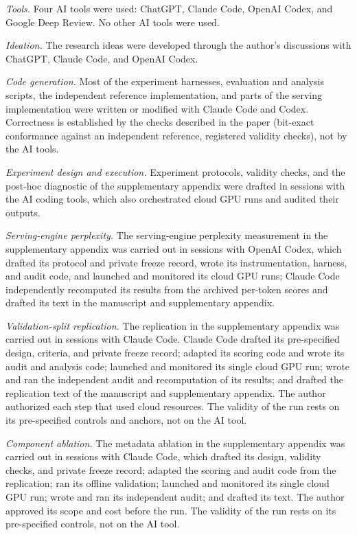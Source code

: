 \documentclass{article}
\begin{document}
\emph{Tools.} Four AI tools were used: ChatGPT, Claude Code, OpenAI Codex, and Google Deep Review. No
other AI tools were used.

\emph{Ideation.} The research ideas were developed through the author's discussions with ChatGPT, Claude Code,
and \mbox{OpenAI} Codex.

\emph{Code generation.} Most of the experiment harnesses, evaluation and analysis scripts, the
independent reference implementation, and parts of the serving implementation were written or modified
with Claude Code and Codex. Correctness is established by the checks described in the paper (bit-exact
conformance against an independent reference, registered validity checks), not by the AI tools.

\emph{Experiment design and execution.} Experiment protocols, validity checks, and the post-hoc
diagnostic of the supplementary appendix were drafted in sessions with the AI coding tools, which also
orchestrated cloud GPU runs and audited their outputs.

\emph{Serving-engine perplexity.} The serving-engine perplexity measurement in the supplementary
appendix was carried out in sessions with OpenAI Codex, which drafted its protocol and private freeze
record, wrote its instrumentation, harness, and audit code, and launched and monitored its cloud GPU
runs; Claude Code independently recomputed its results from the archived per-token scores and drafted
its text in the manuscript and supplementary appendix.

\emph{Validation-split replication.} The replication in the supplementary appendix was carried out in
sessions with Claude Code. Claude Code drafted its pre-specified design, criteria, and private freeze
record; adapted its scoring code and wrote its audit and analysis code; launched and monitored its
single cloud GPU run; wrote and ran the independent audit and recomputation of its results; and drafted
the replication text of the manuscript and supplementary appendix. The author authorized each step
that used cloud resources. The validity of the run rests on its pre-specified controls and anchors, not
on the AI tool.

\emph{Component ablation.} The metadata ablation in the supplementary appendix was carried out in
sessions with Claude Code, which drafted its design, validity checks, and private freeze record; adapted
the scoring and audit code from the replication; ran its offline validation; launched and monitored its
single cloud GPU run; wrote and ran its independent audit; and drafted its text. The author approved its
scope and cost before the run. The validity of the run rests on its pre-specified controls, not on the
AI tool.
\end{document}
